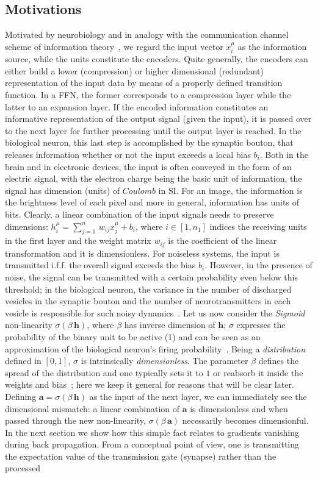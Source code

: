 \documentclass{article}
\begin{document}
\subsection{Motivations} \label{sub:mot}
%
Motivated by neurobiology and in analogy with the communication channel scheme of information theory~\cite{mckay, jaynes}, we regard the input vector $x^{\mu}_i$ as the information source, while the units constitute the encoders. Quite generally, the encoders can either build a lower (compression) or higher dimensional (redundant) representation of the input data by means of a properly defined transition function. In a FFN, the former corresponds to a compression layer while the latter to an expansion layer. If the encoded information constitutes an informative representation of the output signal (given the input), it is passed  over to the next layer for further processing until the output layer is reached. In the biological neuron, this last step is accomplished by the synaptic bouton, that releases information whether or not the input exceeds a local bias $b_i$. Both in the brain and in electronic devices, the input is often conveyed in the form of an electric signal, with the electron charge being the basic unit of information, the signal has dimension (units) of $Coulomb$ in SI. For an image, the information is the brightness level of each pixel and more in general, information has units of bits. Clearly, a linear combination of the input signals needs to preserve dimensions: $h^{\mu}_i = \sum_{j=1}^{n} \, w_{ij} x^{\mu}_j + b_i$, where $i \in [1, n_1]$ indices the receiving units in the first layer and the weight matrix $ w_{ij}$ is the coefficient of the linear transformation and it is dimensionless. For noiseless systems, the input is transmitted i.f.f. the overall signal exceeds the bias $b_i$. However, in the presence of noise, the signal can be transmitted with a certain probability even below this threshold; in the biological neuron, the variance in the number of discharged vesicles in the synaptic bouton and the number of neurotransmitters in each vesicle is responsible for such noisy dynamics~\cite{amit1}. Let us now consider the {\it Sigmoid} non-linearity $\sigma(\beta \, \mathbf{h} )$, where $\beta$  has inverse dimension of $\mathbf{h}$;  $\sigma$ expresses the probability of the binary unit to be active (1) and can be seen as an approximation of the biological neuron's firing probability~\cite{amit1}. Being a {\it distribution} defined in $[0,1]$, $\sigma$ is intrinsically {\it dimensionless}. The parameter $\beta$ defines the spread of the distribution and one typically sets it to $1$ or reabsorb it inside the weights and bias~\cite{zecchina}; here we keep it general for reasons that will be clear later. Defining $\mathbf{a} = \sigma(\beta \, \mathbf{h} )$ as the input of the next layer, we can immediately see the dimensional mismatch: a linear combination of $\mathbf{a}$ is dimensionless and when passed through the new non-linearity, $\sigma(\beta \, \mathbf{a} )$ necessarily becomes dimensionful. In the next section we show how this simple fact relates to gradients vanishing during back propagation. From a conceptual point of view, one is transmitting the expectation value of the transmission gate (synapse) rather than the processed 
\end{document}
